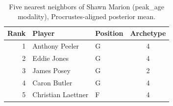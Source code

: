 \begin{table}[htbp]
  \centering\small
  \begin{tabular}{rllc}
    \toprule
    Rank & Player & Position & Archetype \\
    \midrule
    1 & Anthony Peeler & G & 4 \\
    2 & Eddie Jones & G & 4 \\
    3 & James Posey & G & 2 \\
    4 & Caron Butler & G & 4 \\
    5 & Christian Laettner & F & 4 \\
    \bottomrule
  \end{tabular}
  \caption{Five nearest neighbors of Shawn Marion (peak_age modality), Procrustes-aligned posterior mean.}
  \label{tab:Shawn_Marion_neighbors_peak_age}
\end{table}

